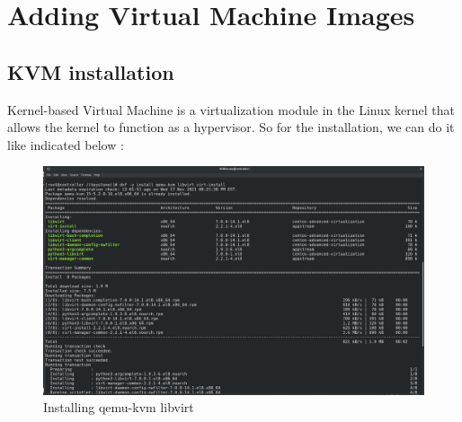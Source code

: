 \chapter{Adding Virtual Machine Images}
\begin{spacing}{1.2}
\section{KVM installation }

\par Kernel-based Virtual Machine is a virtualization module in the Linux kernel that allows the
kernel to function as a hypervisor. So for the installation, we can do it like
indicated below : 
\\
\begin{figure}[!htb] 
\begin{center} 
\includegraphics[width=1\linewidth]{Cloud/Add Virtual Machine Images/KVM Install/Installing qemu-kvm libvirt} 
\end{center} 
\caption{Installing qemu-kvm libvirt} 
\end{figure}  \FloatBarrier
\\


\end{spacing}
